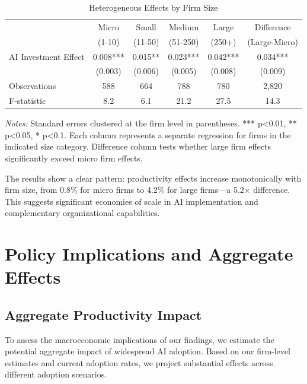 \documentclass[12pt]{article}
\begin{document}
\begin{table}[H]
\centering
\caption{Heterogeneous Effects by Firm Size}
\label{tab:size_heterogeneity}
\begin{tabular}{lccccc}
\toprule
 & Micro & Small & Medium & Large & Difference \\
 & (1-10) & (11-50) & (51-250) & (250+) & (Large-Micro) \\
\midrule
AI Investment Effect & 0.008*** & 0.015** & 0.023*** & 0.042*** & 0.034*** \\
 & (0.003) & (0.006) & (0.005) & (0.008) & (0.009) \\
\midrule
Observations & 588 & 664 & 788 & 780 & 2,820 \\
F-statistic & 8.2 & 6.1 & 21.2 & 27.5 & 14.3 \\
\bottomrule
\end{tabular}
\begin{minipage}{\textwidth}
\footnotesize
\textit{Notes:} Standard errors clustered at the firm level in parentheses. *** p<0.01, ** p<0.05, * p<0.1. Each column represents a separate regression for firms in the indicated size category. Difference column tests whether large firm effects significantly exceed micro firm effects.
\end{minipage}
\end{table}

The results show a clear pattern: productivity effects increase monotonically with firm size, from 0.8\% for micro firms to 4.2\% for large firms—a 5.2× difference. This suggests significant economies of scale in AI implementation and complementary organizational capabilities.

\section{Policy Implications and Aggregate Effects}

\subsection{Aggregate Productivity Impact}

To assess the macroeconomic implications of our findings, we estimate the potential aggregate impact of widespread AI adoption. Based on our firm-level estimates and current adoption rates, we project substantial effects across different adoption scenarios.
\end{document}
